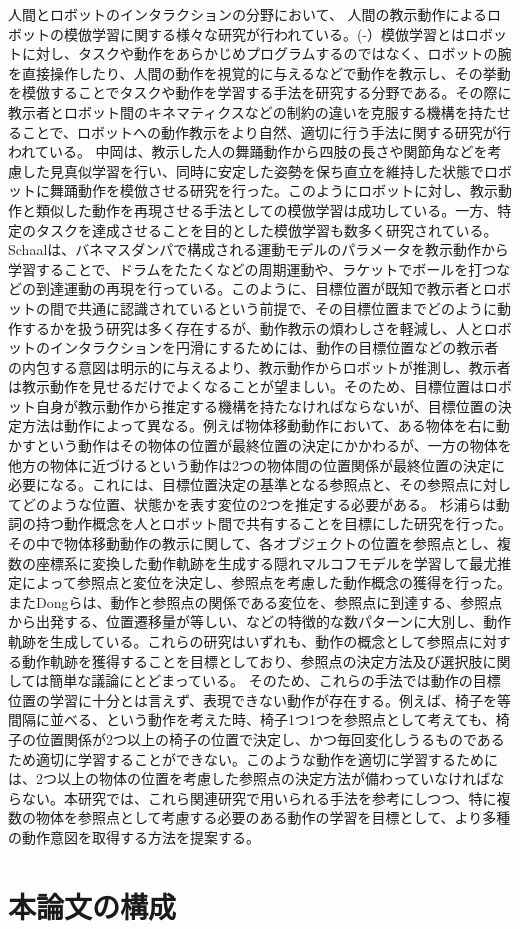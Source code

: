 人間とロボットのインタラクションの分野において、
人間の教示動作によるロボットの模倣学習に関する様々な研究が行われている。(\cite{imitation1}-\cite{imitation4}）模倣学習とはロボットに対し、タスクや動作をあらかじめプログラムするのではなく、ロボットの腕を直接操作したり、人間の動作を視覚的に与えるなどで動作を教示し、その挙動を模倣することでタスクや動作を学習する手法を研究する分野である。その際に教示者とロボット間のキネマティクスなどの制約の違いを克服する機構を持たせることで、ロボットへの動作教示をより自然、適切に行う手法に関する研究が行われている。
中岡\cite{nakaoka}は、教示した人の舞踊動作から四肢の長さや関節角などを考慮した見真似学習を行い、同時に安定した姿勢を保ち直立を維持した状態でロボットに舞踊動作を模倣させる研究を行った。このようにロボットに対し、教示動作と類似した動作を再現させる手法としての模倣学習は成功している。一方、特定のタスクを達成させることを目的とした模倣学習も数多く研究されている。
Schaal\cite{schaal}は、バネマスダンパで構成される運動モデルのパラメータを教示動作から学習することで、ドラムをたたくなどの周期運動や、ラケットでボールを打つなどの到達運動の再現を行っている。このように、目標位置が既知で教示者とロボットの間で共通に認識されているという前提で、その目標位置までどのように動作するかを扱う研究は多く存在するが、動作教示の煩わしさを軽減し、人とロボットのインタラクションを円滑にするためには、動作の目標位置などの教示者の内包する意図は明示的に与えるより、教示動作からロボットが推測し、教示者は教示動作を見せるだけでよくなることが望ましい。そのため、目標位置はロボット自身が教示動作から推定する機構を持たなければならないが、目標位置の決定方法は動作によって異なる。例えば物体移動動作において、ある物体を右に動かすという動作はその物体の位置が最終位置の決定にかかわるが、一方の物体を他方の物体に近づけるという動作は2つの物体間の位置関係が最終位置の決定に必要になる。これには、目標位置決定の基準となる参照点と、その参照点に対してどのような位置、状態かを表す変位の2つを推定する必要がある。
杉浦ら\cite{sugiura}は動詞の持つ動作概念を人とロボット間で共有することを目標にした研究を行った。その中で物体移動動作の教示に関して、各オブジェクトの位置を参照点とし、複数の座標系に変換した動作軌跡を生成する隠れマルコフモデルを学習して最尤推定によって参照点と変位を決定し、参照点を考慮した動作概念の獲得を行った。またDongら\cite{dong}は、動作と参照点の関係である変位を、参照点に到達する、参照点から出発する、位置遷移量が等しい、などの特徴的な数パターンに大別し、動作軌跡を生成している。これらの研究はいずれも、動作の概念として参照点に対する動作軌跡を獲得することを目標としており、参照点の決定方法及び選択肢に関しては簡単な議論にとどまっている。
そのため、これらの手法では動作の目標位置の学習に十分とは言えず、表現できない動作が存在する。例えば、椅子を等間隔に並べる、という動作を考えた時、椅子1つ1つを参照点として考えても、椅子の位置関係が2つ以上の椅子の位置で決定し、かつ毎回変化しうるものであるため適切に学習することができない。このような動作を適切に学習するためには、2つ以上の物体の位置を考慮した参照点の決定方法が備わっていなければならない。本研究では、これら関連研究で用いられる手法を参考にしつつ、特に複数の物体を参照点として考慮する必要のある動作の学習を目標として、より多種の動作意図を取得する方法を提案する。        

\section{本論文の構成}

